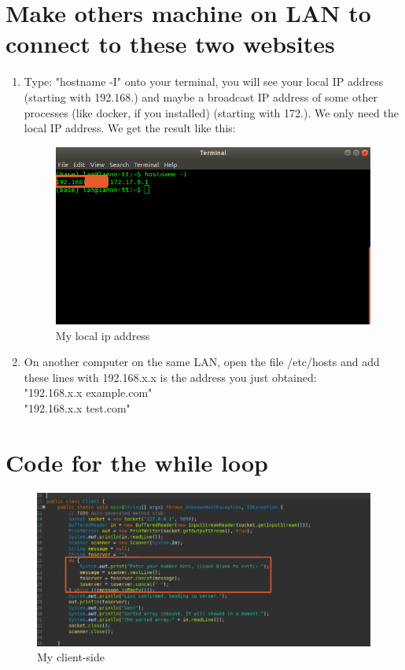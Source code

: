 \documentclass[11pt,a4paper]{article}
\begin{document}
	\section{Make others machine on LAN to connect to these two websites}
	\newpage
	\begin{enumerate}
		\item Type: "hostname -I" onto your terminal, you will see your local IP address (starting with 192.168.) and maybe a broadcast IP address of some other processes (like docker, if you installed) (starting with 172.). We only need the local IP address. We get the result like this:
		\begin{figure}[h!]
  			\includegraphics[width=\linewidth]{local-ip.png}
  			\caption{My local ip address}
  			\label{fig:loc-ip}
		\end{figure}
		\item On another computer on the same LAN, open the file /etc/hosts and add these lines with 192.168.x.x is the address you just obtained:\\
		"192.168.x.x example.com"\\
		"192.168.x.x test.com"
	\end{enumerate}
	\section{Code for the while loop}
	\begin{figure}[h!]
  		\includegraphics[width=\linewidth]{client-code.png}
  		\caption{My client-side}
  		\label{fig:client}
	\end{figure}
	\newpage
\end{document}
